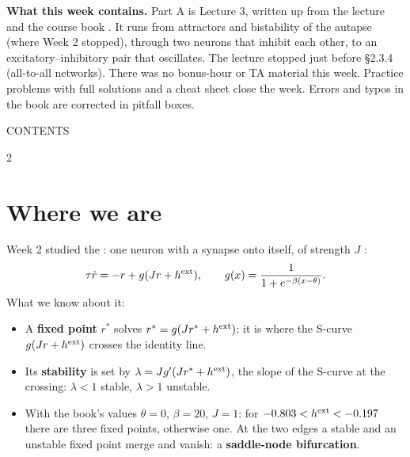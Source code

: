 \begin{plainbox}
\textbf{What this week contains.} Part A is Lecture 3, written up from the lecture and the course book . It runs from attractors and bistability of the autapse
(where Week 2 stopped), through two neurons that inhibit each other, to an excitatory--inhibitory pair that oscillates. The lecture stopped just before \S2.3.4 (all-to-all networks).
There was no bonus-hour or TA material this week. Practice problems with full solutions and a cheat sheet close the week.
Errors and typos in the book are corrected in pitfall boxes.
\end{plainbox}

{\ttfamily\small\color{pgreen}CONTENTS}
\begin{multicols}{2}\footnotesize\setlength{\parskip}{0pt}
\setcounter{tocdepth}{1}
\makeatletter{}\makeatother
\end{multicols}


\section{Where we are}

Week 2 studied the : one neuron with a synapse onto itself, of strength $J$ :
\[ \tau\dot r = -r + g(Jr+h^{\text{ext}}),\qquad g(x)=\frac{1}{1+e^{-\beta(x-\theta)}}. \]
What we know about it:
\begin{itemize}
  \item A \textbf{fixed point} $r^*$ solves $r^*=g(Jr^*+h^{\text{ext}})$: it is where the S-curve $g(Jr+h^{\text{ext}})$ crosses the identity line.
  \item Its \textbf{stability} is set by $\lambda = Jg'(Jr^*+h^{\text{ext}})$, the slope of the S-curve at the crossing: $\lambda<1$ stable, $\lambda>1$ unstable.
  \item With the book's values $\theta=0$, $\beta=20$, $J=1$: for $-0.803<h^{\text{ext}}<-0.197$ there are three fixed points, otherwise one. At the two edges a stable and an unstable fixed point merge and vanish: a \textbf{saddle-node bifurcation}.
\end{itemize}

